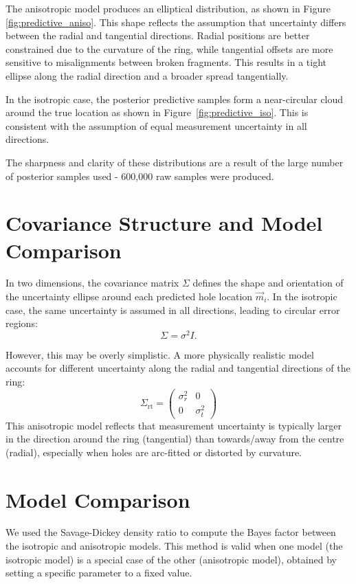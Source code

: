 \documentclass[a4paper,12pt]{article}
\begin{document}
The anisotropic model produces an elliptical distribution, as shown in Figure \ref{fig:predictive_aniso}. This shape reflects the assumption that uncertainty differs between the radial and tangential directions. Radial positions are better constrained due to the curvature of the ring, while tangential offsets are more sensitive to misalignments between broken fragments. This results in a tight ellipse along the radial direction and a broader spread tangentially.

In the isotropic case, the posterior predictive samples form a near-circular cloud around the true location as shown in Figure~\ref{fig:predictive_iso}. This is consistent with the assumption of equal measurement uncertainty in all directions.

The sharpness and clarity of these distributions are a result of the large number of posterior samples used - 600,000 raw samples were produced.

\section{Covariance Structure and Model Comparison}

In two dimensions, the covariance matrix $\Sigma$ defines the shape and orientation of the uncertainty ellipse around each predicted hole location $\vec{m}_i$. In the isotropic case, the same uncertainty is assumed in all directions, leading to circular error regions:
\[
\Sigma = \sigma^2 I.
\]

However, this may be overly simplistic. A more physically realistic model accounts for different uncertainty along the radial and tangential directions of the ring:
\[
\Sigma_{\text{rt}} = 
\begin{pmatrix}
\sigma_r^2 & 0 \\
0 & \sigma_t^2
\end{pmatrix}
\]
This anisotropic model reflects that measurement uncertainty is typically larger in the direction around the ring (tangential) than towards/away from the centre (radial), especially when holes are arc-fitted or distorted by curvature.

\section*{Model Comparison}

We used the Savage-Dickey density ratio to compute the Bayes factor between the isotropic and anisotropic models. This method is valid when one model (the isotropic model) is a special case of the other (anisotropic model), obtained by setting a specific parameter to a fixed value.
\end{document}
